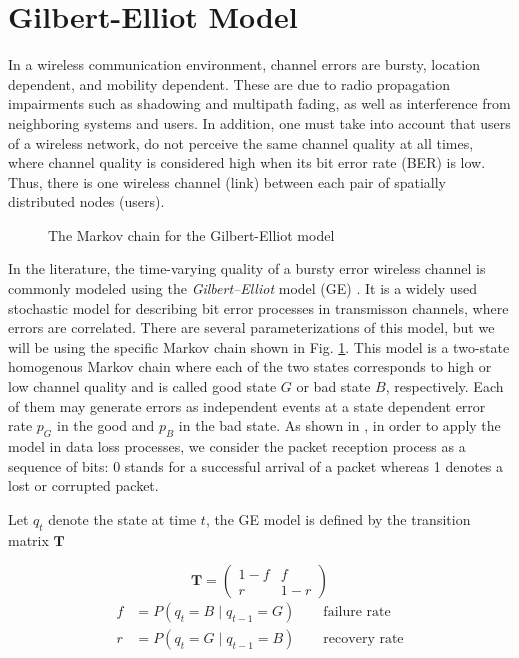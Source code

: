 \section{Gilbert-Elliot Model} \label{sec:GE}

In a wireless communication environment, channel errors are bursty, location
dependent, and mobility dependent. These are due to radio propagation
impairments such as shadowing and multipath fading, as well as interference from
neighboring systems and users. In addition, one must take into account that
users of a wireless network, do not perceive the same channel quality at all
times, where channel quality is considered high when its bit error rate (BER) is
low. Thus, there is one wireless channel (link) between each pair of spatially
distributed nodes (users). 

\begin{figure}[h]
  \centering
   
  \caption{The Markov chain for the Gilbert-Elliot model}
  \label{fig:GE_FSM}
\end{figure}

In the literature, the time-varying quality of a bursty error wireless channel
is commonly modeled using the \textit{Gilbert–Elliot} model (GE)
\cite{gilbert1960capacity}
\cite{elliott1963estimates}. It is a widely used stochastic model for describing
bit error processes in transmisson channels, where errors are correlated. There
are several parameterizations of this model, but we will be using the specific
Markov chain shown in Fig. \ref{fig:GE_FSM}. This model is a two-state
homogenous Markov chain where each of the two states corresponds to high or low
channel quality and is called good state $G$ or bad state $B$, respectively.
Each of them may generate errors as independent events at a state dependent
error rate $p_G$ in the good and $p_B$ in the bad state. As shown in
\cite{hasslinger2008gilbert}, in order to apply the model in data loss
processes, we consider the packet reception process as a sequence of bits: 0
stands for a successful arrival of a packet whereas 1 denotes a lost or
corrupted packet.

Let $q_t$ denote the state at time $t$, the GE model is defined by the
transition matrix $\mathbf{T}$

\begin{equation*}
  \mathbf{T} = \left (\begin{array}{cc} 1-f & f \\ r & 1-r \end{array} \right) 
\end{equation*}
\begin{align*}
  f &= P(q_t = B \mid q_{t-1} = G) \qquad \textrm{failure rate} \\
  r &= P(q_t = G \mid q_{t-1} = B) \qquad \textrm{recovery rate}
\end{align*}

